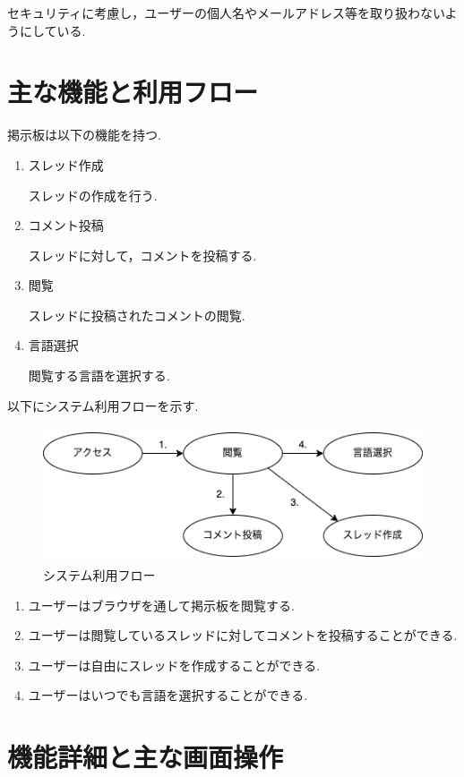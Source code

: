 \documentclass[b5paper,12pt,dvipdfmx]{jsreport}
\begin{document}
セキュリティに考慮し，ユーザーの個人名やメールアドレス等を取り扱わないようにしている.

\section{主な機能と利用フロー}

掲示板は以下の機能を持つ.
\begin{enumerate}
	\item スレッド作成
	
	スレッドの作成を行う.
	\item コメント投稿
	
	スレッドに対して，コメントを投稿する.
	\item 閲覧
	
	スレッドに投稿されたコメントの閲覧.
	\item 言語選択
	
	閲覧する言語を選択する.
\end{enumerate}

以下にシステム利用フローを示す.

\begin{figure}[htbp]
	\centering
	\includegraphics[width=124mm,height=40mm]{img/system_usage_flow.png}

	\caption{システム利用フロー}
\end{figure}

\begin{enumerate}
    \item ユーザーはブラウザを通して掲示板を閲覧する.
	\item ユーザーは閲覧しているスレッドに対してコメントを投稿することができる.
	\item ユーザーは自由にスレッドを作成することができる.
	\item ユーザーはいつでも言語を選択することができる.
\end{enumerate}


\section{機能詳細と主な画面操作}
\end{document}
